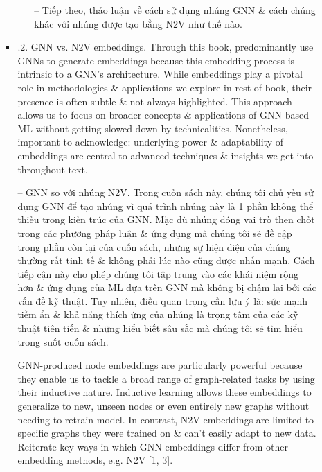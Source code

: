 \documentclass{article}
\begin{document}
\begin{itemize}
\begin{itemize}
\begin{itemize}
\begin{itemize}
               -- Tiếp theo, thảo luận về cách sử dụng nhúng GNN \& cách chúng khác với nhúng được tạo bằng N2V như thế nào.
           \end{itemize}
           \item {.2. GNN vs. N2V embeddings.} Through this book, predominantly use GNNs to generate embeddings because this embedding process is intrinsic to a GNN's architecture. While embeddings play a pivotal role in methodologies \& applications we explore in rest of book, their presence is often subtle \& not always highlighted. This approach allows us to focus on broader concepts \& applications of GNN-based ML without getting slowed down by technicalities. Nonetheless, important to acknowledge: underlying power \& adaptability of embeddings are central to advanced techniques \& insights we get into throughout text.

           -- {\sf GNN so với nhúng N2V.} Trong cuốn sách này, chúng tôi chủ yếu sử dụng GNN để tạo nhúng vì quá trình nhúng này là 1 phần không thể thiếu trong kiến trúc của GNN. Mặc dù nhúng đóng vai trò then chốt trong các phương pháp luận \& ứng dụng mà chúng tôi sẽ đề cập trong phần còn lại của cuốn sách, nhưng sự hiện diện của chúng thường rất tinh tế \& không phải lúc nào cũng được nhấn mạnh. Cách tiếp cận này cho phép chúng tôi tập trung vào các khái niệm rộng hơn \& ứng dụng của ML dựa trên GNN mà không bị chậm lại bởi các vấn đề kỹ thuật. Tuy nhiên, điều quan trọng cần lưu ý là: sức mạnh tiềm ẩn \& khả năng thích ứng của nhúng là trọng tâm của các kỹ thuật tiên tiến \& những hiểu biết sâu sắc mà chúng tôi sẽ tìm hiểu trong suốt cuốn sách.

           GNN-produced node embeddings are particularly powerful because they enable us to tackle a broad range of graph-related tasks by using their inductive nature. Inductive learning allows these embeddings to generalize to new, unseen nodes or even entirely new graphs without needing to retrain model. In contrast, N2V embeddings are limited to specific graphs they were trained on \& can't easily adapt to new data. Reiterate key ways in which GNN embeddings differ from other embedding methods, e.g. N2V [1, 3].


\end{itemize}
\end{itemize}
\end{itemize}
\end{document}
